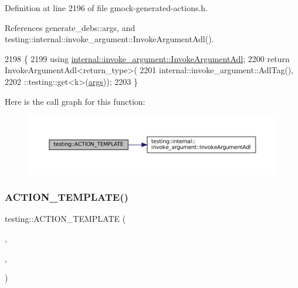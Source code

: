 Definition at line 2196 of file gmock-\/generated-\/actions.\+h.



References generate\+\_\+debs\+::args, and testing\+::internal\+::invoke\+\_\+argument\+::\+Invoke\+Argument\+Adl().


\begin{DoxyCode}
2198                                       \{
2199   \textcolor{keyword}{using} \hyperlink{namespacetesting_1_1internal_1_1invoke__argument_abd36164191a3e386c50243074854b272}{internal::invoke\_argument::InvokeArgumentAdl};
2200   \textcolor{keywordflow}{return} InvokeArgumentAdl<return\_type>(
2201       internal::invoke\_argument::AdlTag(),
2202       ::testing::get<k>(\hyperlink{namespacegenerate__debs_a75f9143e38df82d83b2e8a6f99cae02c}{args}));
2203 \}
\end{DoxyCode}
Here is the call graph for this function\+:
\nopagebreak
\begin{figure}[H]
\begin{center}
\leavevmode
\includegraphics[width=350pt]{namespacetesting_a8a02397c7fdf8e84d559ab72dcc28eb1_cgraph}
\end{center}
\end{figure}
\mbox{\label{namespacetesting_afaa0d88f5442f9aee5d6147377d3e50c}} 
\subsubsection{\texorpdfstring{A\+C\+T\+I\+O\+N\+\_\+\+T\+E\+M\+P\+L\+A\+T\+E()}{ACTION\_TEMPLATE()}\hspace{0.1cm}{\footnotesize\ttfamily [8/28]}}
{\footnotesize\ttfamily testing\+::\+A\+C\+T\+I\+O\+N\+\_\+\+T\+E\+M\+P\+L\+A\+TE (\begin{DoxyParamCaption}\item[{Invoke\+Argument}]{,  }\item[{H\+A\+S\+\_\+1\+\_\+\+T\+E\+M\+P\+L\+A\+T\+E\+\_\+\+P\+A\+R\+A\+MS(int, k)}]{,  }\item[{A\+N\+D\+\_\+1\+\_\+\+V\+A\+L\+U\+E\+\_\+\+P\+A\+R\+A\+MS(p0)}]{ }\end{DoxyParamCaption})}




